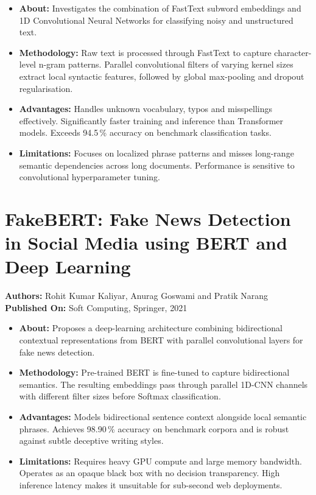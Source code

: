 \documentclass[12pt,a4paper,oneside]{report}
\begin{document}
\begin{itemize}[leftmargin=*, itemsep=2pt]
  \item \textbf{About:} Investigates the combination of FastText subword embeddings and
        1D Convolutional Neural Networks for classifying noisy and unstructured text.
  \item \textbf{Methodology:} Raw text is processed through FastText to capture
        character-level n-gram patterns. Parallel convolutional filters of varying kernel
        sizes extract local syntactic features, followed by global max-pooling and
        dropout regularisation.
  \item \textbf{Advantages:} Handles unknown vocabulary, typos and misspellings
        effectively. Significantly faster training and inference than Transformer models.
        Exceeds 94.5\,\% accuracy on benchmark classification tasks.
  \item \textbf{Limitations:} Focuses on localized phrase patterns and misses long-range
        semantic dependencies across long documents. Performance is sensitive to
        convolutional hyperparameter tuning.
\end{itemize}

\section{FakeBERT: Fake News Detection in Social Media using BERT and Deep Learning}
\textbf{Authors:} Rohit Kumar Kaliyar, Anurag Goswami and Pratik Narang\\
\textbf{Published On:} Soft Computing, Springer, 2021

\begin{itemize}[leftmargin=*, itemsep=2pt]
  \item \textbf{About:} Proposes a deep-learning architecture combining bidirectional
        contextual representations from BERT with parallel convolutional layers for fake
        news detection.
  \item \textbf{Methodology:} Pre-trained BERT is fine-tuned to capture bidirectional
        semantics. The resulting embeddings pass through parallel 1D-CNN channels with
        different filter sizes before Softmax classification.
  \item \textbf{Advantages:} Models bidirectional sentence context alongside local
        semantic phrases. Achieves 98.90\,\% accuracy on benchmark corpora and is robust
        against subtle deceptive writing styles.
  \item \textbf{Limitations:} Requires heavy GPU compute and large memory bandwidth.
        Operates as an opaque black box with no decision transparency. High inference
        latency makes it unsuitable for sub-second web deployments.
\end{itemize}
\end{document}
